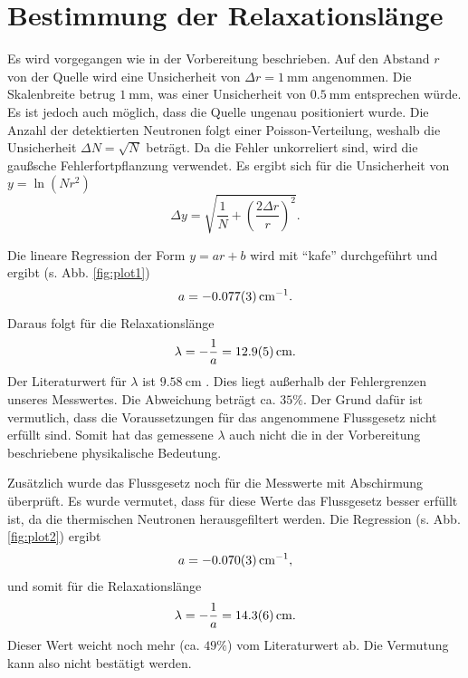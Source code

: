 \section{Bestimmung der Relaxationslänge}

Es wird vorgegangen wie in der Vorbereitung beschrieben. Auf den Abstand $r$ von der Quelle wird eine Unsicherheit von $\Delta r=\SI{1}{\milli\metre}$ angenommen. Die Skalenbreite betrug $\SI{1}{\milli\metre}$, was einer Unsicherheit von $\SI{0,5}{\milli\metre}$ entsprechen würde. Es ist jedoch auch möglich, dass die Quelle ungenau positioniert wurde.
Die Anzahl der detektierten Neutronen folgt einer Poisson-Verteilung, weshalb die Unsicherheit $\Delta N=\sqrt{N}$ beträgt. Da die Fehler unkorreliert sind, wird die gaußsche Fehlerfortpflanzung verwendet. Es ergibt sich für die Unsicherheit von $y=\ln(Nr^{2})$
\begin{equation}
 \Delta y = \sqrt{\frac{1}{N}+\left(\frac{2\Delta r}{r}\right)^{2}}.
\end{equation}

Die lineare Regression der Form $y=ar+b$ wird mit ``kafe'' durchgeführt und ergibt (s. Abb. \ref{fig:plot1})
\begin{equation}
 a = \SI{-0,077\pm0,003}{\per\centi\metre}.
\end{equation}
Daraus folgt für die Relaxationslänge
\begin{equation}
 \lambda = -\frac{1}{a} = \SI{12,9\pm0,5}{\centi\metre}.
\end{equation}
Der Literaturwert für $\lambda$ ist $\SI{9,58}{\centi\metre}$ \cite{Tittman}. Dies liegt außerhalb der Fehlergrenzen unseres Messwertes. Die Abweichung beträgt ca. $35\%$. Der Grund dafür ist vermutlich, dass die Voraussetzungen für das angenommene Flussgesetz nicht erfüllt sind. Somit hat das gemessene $\lambda$ auch nicht die in der Vorbereitung beschriebene physikalische Bedeutung.

Zusätzlich wurde das Flussgesetz noch für die Messwerte mit Abschirmung überprüft. Es wurde vermutet, dass für diese Werte das Flussgesetz besser erfüllt ist, da die thermischen Neutronen herausgefiltert werden. Die Regression (s. Abb. \ref{fig:plot2}) ergibt
\begin{equation}
 a = \SI{-0,070\pm0,003}{\per\centi\metre},
\end{equation}
und somit für die Relaxationslänge
\begin{equation}
 \lambda = -\frac{1}{a} = \SI{14,3\pm0,6}{\centi\metre}.
\end{equation}
Dieser Wert weicht noch mehr (ca. $49\%$) vom Literaturwert ab. Die Vermutung kann also nicht bestätigt werden.

